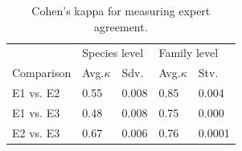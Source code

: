 

\begin{table}[t!]
\centering
  \caption{Cohen's kappa for measuring expert agreement.}
 \begin{tabular}{@{~}l@{~~~}l@{~~~}l@{~~~~~}l@{~~~}l@{~}}
 \hline
  & \multicolumn{2}{l}{Species level} & \multicolumn{2}{l}{Family level}\\
  Comparison & Avg.$\kappa$ & Sdv.& Avg.$\kappa$ & Stv.\\
  \hline
  E1 vs. E2  & 0.55 & 0.008 & 0.85 & 0.004\\
  E1 vs. E3  & 0.48 & 0.008 & 0.75 & 0.000\\
  E2 vs. E3  & 0.67 & 0.006 & 0.76 & 0.0001\\
  \hline
 \end{tabular}
\label{tab:expert_agree}
\end{table}
%


%

